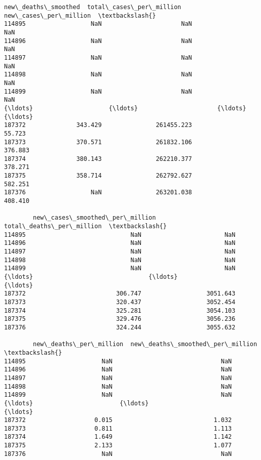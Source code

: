 \documentclass[11pt]{article}
\begin{document}
\begin{tcolorbox}[breakable, size=fbox, boxrule=.5pt, pad at break*=1mm, opacityfill=0]
\begin{Verbatim}[commandchars=\\\{\}]
        new\_deaths\_smoothed  total\_cases\_per\_million  new\_cases\_per\_million  \textbackslash{}
114895                  NaN                      NaN                    NaN
114896                  NaN                      NaN                    NaN
114897                  NaN                      NaN                    NaN
114898                  NaN                      NaN                    NaN
114899                  NaN                      NaN                    NaN
{\ldots}                     {\ldots}                      {\ldots}                    {\ldots}
187372              343.429               261455.223                 55.723
187373              370.571               261832.106                376.883
187374              380.143               262210.377                378.271
187375              358.714               262792.627                582.251
187376                  NaN               263201.038                408.410

        new\_cases\_smoothed\_per\_million  total\_deaths\_per\_million  \textbackslash{}
114895                             NaN                       NaN
114896                             NaN                       NaN
114897                             NaN                       NaN
114898                             NaN                       NaN
114899                             NaN                       NaN
{\ldots}                                {\ldots}                       {\ldots}
187372                         306.747                  3051.643
187373                         320.437                  3052.454
187374                         325.281                  3054.103
187375                         329.476                  3056.236
187376                         324.244                  3055.632

        new\_deaths\_per\_million  new\_deaths\_smoothed\_per\_million  \textbackslash{}
114895                     NaN                              NaN
114896                     NaN                              NaN
114897                     NaN                              NaN
114898                     NaN                              NaN
114899                     NaN                              NaN
{\ldots}                        {\ldots}                              {\ldots}
187372                   0.015                            1.032
187373                   0.811                            1.113
187374                   1.649                            1.142
187375                   2.133                            1.077
187376                     NaN                              NaN


\end{Verbatim}
\end{tcolorbox}
\end{document}
